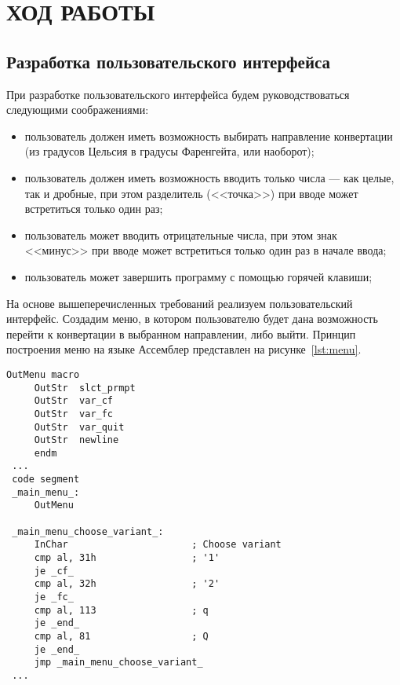 \section{ХОД РАБОТЫ}

\subsection{Разработка пользовательского интерфейса}

При разработке пользовательского интерфейса будем
руководствоваться следующими соображениями:
\begin{itemize}
    \item пользователь должен иметь возможность выбирать направление
    конвертации (из градусов Цельсия в градусы Фаренгейта, или наоборот);

    \item пользователь должен иметь возможность вводить только числа --- как целые,
      так и дробные, при этом разделитель (<<точка>>) при вводе может встретиться
      только один раз;

    \item пользователь может вводить отрицательные числа,
      при этом знак <<минус>> при вводе может встретиться только один раз в начале ввода;

    \item пользователь может завершить программу с помощью горячей клавиши;
\end{itemize}

На основе вышеперечисленных требований реализуем пользовательский интерфейс.
Создадим меню, в котором пользователю будет дана возможность перейти к конвертации
в выбранном направлении, либо выйти. Принцип построения меню на языке Ассемблер
представлен на рисунке~\ref{lst:menu}.

\begin{lstlisting}[caption=Принцип построения пользователького меню,
label=lst:menu,language={[x86masm]Assembler},basicstyle=\scriptsize\ttfamily]
 OutMenu macro
     OutStr  slct_prmpt
     OutStr  var_cf
     OutStr  var_fc
     OutStr  var_quit
     OutStr  newline
     endm
 ...
 code segment
 _main_menu_:
     OutMenu

 _main_menu_choose_variant_:
     InChar                      ; Choose variant
     cmp al, 31h                 ; '1'
     je _cf_
     cmp al, 32h                 ; '2'
     je _fc_
     cmp al, 113                 ; q
     je _end_
     cmp al, 81                  ; Q
     je _end_
     jmp _main_menu_choose_variant_
 ...
\end{lstlisting}

